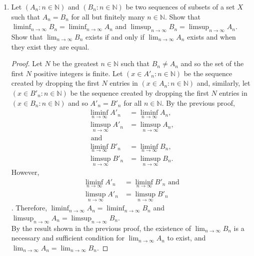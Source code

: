 \documentclass[12pt]{article}
\newcommand{\N}{\mathbb{N}}
\newenvironment{problem}[2][Problem]{\begin{trivlist}
		\item[\hskip \labelsep {\bfseries #1}\hskip \labelsep {\bfseries #2.}]}{\end{trivlist}}
\begin{document}
\begin{problem}{1.2}
\begin{enumerate}[label=\textbf{(\alph*)}]
		\item Let $\left(A_{n}: n\in \N\right)$ and $\left(B_{n}: n \in \N\right)$ be two sequences of subsets of a set $X$ such that $A_{n} = B_{n}$ for all but finitely many $n\in \N$. Show that $\liminf_{n\to \infty} B_{n} = \liminf_{n\to \infty} A_{n}$ and $\limsup_{n\to \infty} B_{n} = \limsup_{n\to \infty} A_{n}$. Show that $\lim_{n\to \infty} B_{n}$ exists if and only if $\lim_{n\to \infty} A_{n}$ exists and when they exist they are equal. 
		\begin{proof}
			Let $N$ be the greatest $n\in \N$ such that $B_{n} \neq A_{n}$ and so the set of the first $N$ positive integers is finite. Let $ \left(x\in A'_{n}:n\in \N\right)$ be the sequence created by dropping the  first $N$ entries in $ \left(x\in A_{n}:n\in \N\right)$ and, similarly, let $\left(x\in B'_{n}:n\in \N\right)$ be the sequence created by dropping the first $N$ entries in $\left(x \in B_{n}: n \in \N\right)$ and so $A'_{n} = B'_{n}$ for all $n\in \N$. By the previous proof, 
			\begin{align*}
				\liminf_{n\to \infty} A'_{n} &= \liminf_{n\to \infty} A_{n},\\
				\limsup_{n\to \infty} A'_{n} &= \limsup_{n\to \infty} A_{n},\\
				\text{ and }\\
				\liminf_{n\to \infty} B'_{n} &= \liminf_{n\to \infty} B_{n},\\
				\limsup_{n\to \infty} B'_{n} &= \limsup_{n\to \infty} B_{n}.
			\end{align*}
			 However, 
			 \begin{align*}
			 	\liminf_{n\to \infty} A'_{n} &= \liminf_{n\to \infty} B'_{n} \text{ and}\\
			 	\limsup_{n\to \infty} A'_{n} &= \limsup_{n\to \infty} B'_{n}
			 \end{align*}.
		 Therefore, $\liminf_{n\to \infty} A_{n} = \liminf_{n\to \infty} B_{n}$ and $\limsup_{n\to \infty}A_{n} = \limsup_{n\to \infty} B_{n}$.\\
		 
			By the result shown in the previous proof, the existence of $\lim_{n \to \infty} B_{n}$ is a necessary and sufficient condition for $\lim_{n \to \infty} A_{n}$ to exist, and $\lim_{n\to \infty} A_{n} = \lim_{n \to \infty} B_{n}$.  
		\end{proof}
	\end{enumerate}
\end{problem} 
\end{document}
